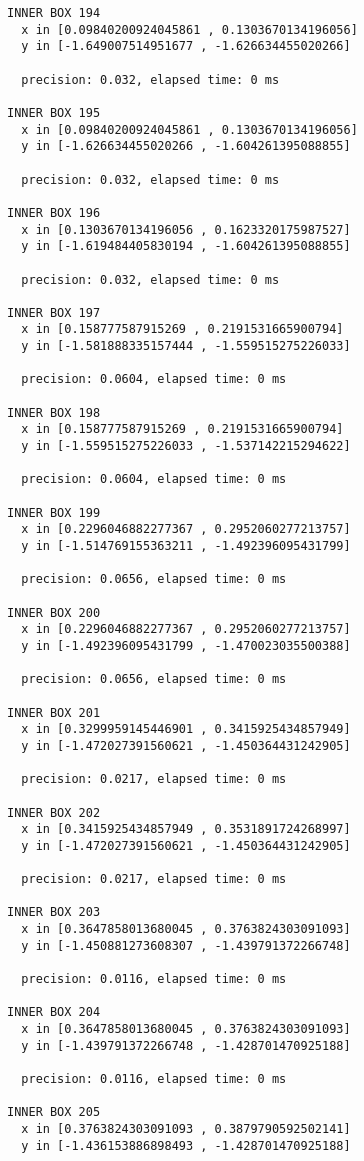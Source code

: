 \begin{verbatim}
INNER BOX 194
  x in [0.09840200924045861 , 0.1303670134196056]
  y in [-1.649007514951677 , -1.626634455020266]

  precision: 0.032, elapsed time: 0 ms

INNER BOX 195
  x in [0.09840200924045861 , 0.1303670134196056]
  y in [-1.626634455020266 , -1.604261395088855]

  precision: 0.032, elapsed time: 0 ms

INNER BOX 196
  x in [0.1303670134196056 , 0.1623320175987527]
  y in [-1.619484405830194 , -1.604261395088855]

  precision: 0.032, elapsed time: 0 ms

INNER BOX 197
  x in [0.158777587915269 , 0.2191531665900794]
  y in [-1.581888335157444 , -1.559515275226033]

  precision: 0.0604, elapsed time: 0 ms

INNER BOX 198
  x in [0.158777587915269 , 0.2191531665900794]
  y in [-1.559515275226033 , -1.537142215294622]

  precision: 0.0604, elapsed time: 0 ms

INNER BOX 199
  x in [0.2296046882277367 , 0.2952060277213757]
  y in [-1.514769155363211 , -1.492396095431799]

  precision: 0.0656, elapsed time: 0 ms

INNER BOX 200
  x in [0.2296046882277367 , 0.2952060277213757]
  y in [-1.492396095431799 , -1.470023035500388]

  precision: 0.0656, elapsed time: 0 ms

INNER BOX 201
  x in [0.3299959145446901 , 0.3415925434857949]
  y in [-1.472027391560621 , -1.450364431242905]

  precision: 0.0217, elapsed time: 0 ms

INNER BOX 202
  x in [0.3415925434857949 , 0.3531891724268997]
  y in [-1.472027391560621 , -1.450364431242905]

  precision: 0.0217, elapsed time: 0 ms

INNER BOX 203
  x in [0.3647858013680045 , 0.3763824303091093]
  y in [-1.450881273608307 , -1.439791372266748]

  precision: 0.0116, elapsed time: 0 ms

INNER BOX 204
  x in [0.3647858013680045 , 0.3763824303091093]
  y in [-1.439791372266748 , -1.428701470925188]

  precision: 0.0116, elapsed time: 0 ms

INNER BOX 205
  x in [0.3763824303091093 , 0.3879790592502141]
  y in [-1.436153886898493 , -1.428701470925188]


\end{verbatim}
